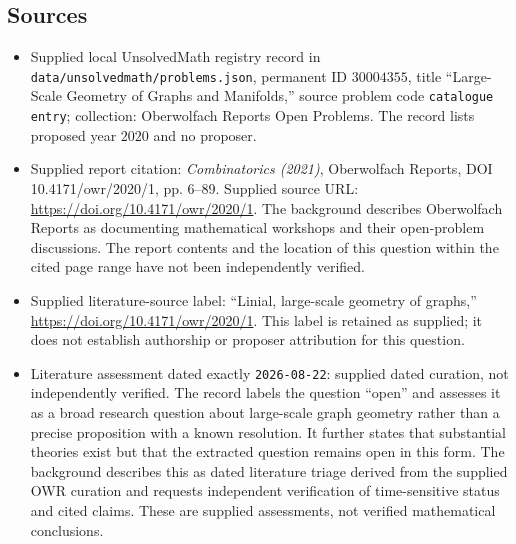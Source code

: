 \documentclass[11pt]{article}
\begin{document}
\subsection{Sources}
\begin{itemize}
\item Supplied local UnsolvedMath registry record in \texttt{data/unsolvedmath/problems.json}, permanent ID \(30004355\), title ``Large-Scale Geometry of Graphs and Manifolds,'' source problem code \texttt{catalogue entry}; collection: Oberwolfach Reports Open Problems. The record lists proposed year \(2020\) and no proposer.
\item Supplied report citation: \emph{Combinatorics (2021)}, Oberwolfach Reports, DOI 10.4171/owr/2020/1, pp. 6--89. Supplied source URL: \url{https://doi.org/10.4171/owr/2020/1}. The background describes Oberwolfach Reports as documenting mathematical workshops and their open-problem discussions. The report contents and the location of this question within the cited page range have not been independently verified.
\item Supplied literature-source label: ``Linial, large-scale geometry of graphs,'' \url{https://doi.org/10.4171/owr/2020/1}. This label is retained as supplied; it does not establish authorship or proposer attribution for this question.
\item Literature assessment dated exactly \texttt{2026-08-22}: supplied dated curation, not independently verified. The record labels the question ``open'' and assesses it as a broad research question about large-scale graph geometry rather than a precise proposition with a known resolution. It further states that substantial theories exist but that the extracted question remains open in this form. The background describes this as dated literature triage derived from the supplied OWR curation and requests independent verification of time-sensitive status and cited claims. These are supplied assessments, not verified mathematical conclusions.
\end{itemize}
\end{document}
